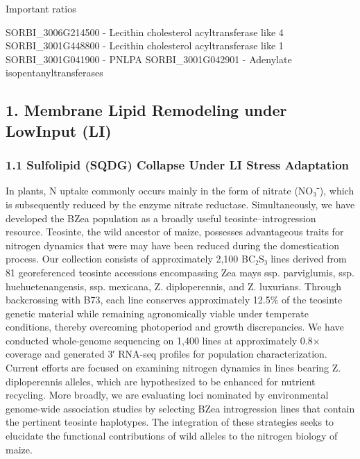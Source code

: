 \documentclass[10pt,letterpaper]{article}
\begin{document}
Important ratios 


SORBI_3006G214500 - Lecithin cholesterol acyltransferase like 4
SORBI_3001G448800 - Lecithin cholesterol acyltransferase like 1
SORBI_3001G041900 - PNLPA
SORBI_3001G042901 - Adenylate isopentanyltransferases


\subsection*{1. Membrane Lipid Remodeling under LowInput (LI)}

\subsubsection*{1.1 Sulfolipid (SQDG) Collapse Under LI Stress Adaptation}

In plants, N uptake commonly occurs mainly in the form of nitrate (NO₃⁻), which is subsequently reduced by the enzyme nitrate reductase.
Simultaneously, we have developed the BZea population as a broadly useful teosinte–introgression resource. Teosinte, the wild ancestor of maize, possesses advantageous traits for nitrogen dynamics that were may have been reduced during the domestication process. Our collection consists of approximately 2,100 BC₂S₃ lines derived from 81 georeferenced teosinte accessions encompassing Zea mays ssp. parviglumis, ssp. huehuetenangensis, ssp. mexicana, Z. diploperennis, and Z. luxurians. Through backcrossing with B73, each line conserves approximately 12.5\% of the teosinte genetic material while remaining agronomically viable under temperate conditions, thereby overcoming photoperiod and growth discrepancies. We have conducted whole-genome sequencing on 1,400 lines at approximately 0.8× coverage and generated 3′ RNA-seq profiles for population characterization. Current efforts are focused on examining nitrogen dynamics in lines bearing Z. diploperennis alleles, which are hypothesized to be enhanced for nutrient recycling. More broadly, we are evaluating loci nominated by environmental genome-wide association studies by selecting BZea introgression lines that contain the pertinent teosinte haplotypes. The integration of these strategies seeks to elucidate the functional contributions of wild alleles to the nitrogen biology of maize.
\end{document}
